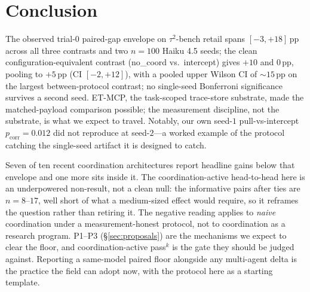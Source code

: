 
\section{Conclusion}
\label{sec:conclusion}

The observed trial-0 paired-gap envelope on $\tau^2$-bench
retail spans $[{-}3,{+}18]$\,pp across all three contrasts and
two $n{=}100$ Haiku 4.5 seeds; the clean
configuration-equivalent contrast (no\_coord vs.\ intercept)
gives $+10$ and $0$\,pp, pooling to $+5$\,pp (CI
$[{-}2,{+}12]$), with a pooled upper Wilson CI of
${\sim}15$\,pp on the largest between-protocol contrast; no
single-seed Bonferroni significance survives a second seed. ET-MCP, the task-scoped
trace-store substrate, made the matched-payload comparison
possible; the measurement discipline, not the substrate, is
what we expect to travel. Notably, our own seed-$1$
pull-vs-intercept $p_{\text{corr}}{=}0.012$ did not reproduce
at seed-$2$---a worked example of the protocol catching the
single-seed artifact it is designed to catch.

Seven of ten recent coordination architectures report headline
gains below that envelope and one more sits inside it. The
coordination-active head-to-head here is an underpowered
non-result, not a clean null: the informative pairs after ties
are $n{=}8$--$17$, well short of what a medium-sized effect
would require, so it reframes the question rather than retiring
it. The negative reading applies to \emph{naive} coordination
under a measurement-honest protocol, not to coordination as a
research program. P1--P3 (\S\ref{sec:proposals}) are the
mechanisms we expect to clear the floor, and
coordination-active pass$^k$ is the gate they should be judged
against. Reporting a same-model paired floor alongside any
multi-agent delta is the practice the field can adopt
now, with the protocol here as a starting template.
